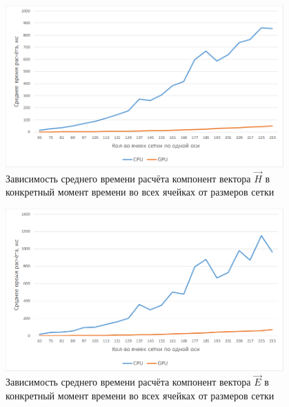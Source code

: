 \begin{figure}[p]
\centering
\captionsetup{justification=centering}
\includegraphics[width=0.95\textwidth]{include/graphics/image12}
\caption{Зависимость среднего времени расчёта компонент вектора $\vec{H}$ в конкретный момент времени во всех ячейках от размеров сетки}
\label{fig:1stComparsion}
\end{figure}
\begin{figure}[p]
\centering
\captionsetup{justification=centering}
\includegraphics[width=0.95\textwidth]{include/graphics/image13}
\caption{Зависимость среднего времени расчёта компонент вектора $\vec{E}$ в конкретный момент времени во всех ячейках от размеров сетки}
\label{fig:2ndComparsion}
\end{figure}

\clearpage